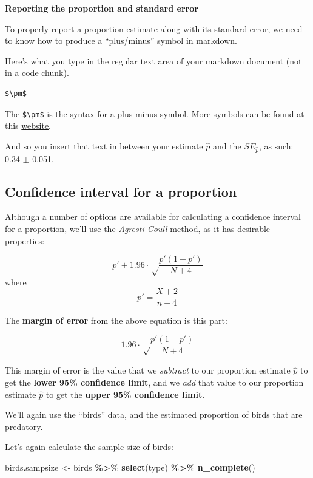 \documentclass[
]{book}
\newenvironment{Shaded}{\begin{snugshade}}{\end{snugshade}}
\newcommand{\FunctionTok}[1]{\textcolor[rgb]{0.13,0.29,0.53}{\textbf{#1}}}
\newcommand{\NormalTok}[1]{#1}
\newcommand{\OtherTok}[1]{\textcolor[rgb]{0.56,0.35,0.01}{#1}}
\newcommand{\SpecialCharTok}[1]{\textcolor[rgb]{0.81,0.36,0.00}{\textbf{#1}}}
\begin{document}
\textbf{Reporting the proportion and standard error}

To properly report a proportion estimate along with its standard error, we need to know how to produce a ``plus/minus'' symbol in markdown.

Here's what you type in the regular text area of your markdown document (not in a code chunk).

\begin{verbatim}
$\pm$
\end{verbatim}

The \texttt{\$\textbackslash{}pm\$} is the syntax for a plus-minus symbol. More symbols can be found at this \href{https://rpruim.github.io/s341/S19/from-class/MathinRmd.html}{website}.

And so you insert that text in between your estimate \(\hat{p}\) and the \(SE_\hat{p}\), as such: 0.34 \(\pm\) 0.051.

\subsection{Confidence interval for a proportion}\label{confint_prop}

Although a number of options are available for calculating a confidence interval for a proportion, we'll use the \emph{Agresti-Coull} method, as it has desirable properties:

\[p' \pm 1.96\cdot \sqrt\frac{p'(1-p')}{N+4}\] where \[p' = \frac{X+2}{n+4}\]

The \textbf{margin of error} from the above equation is this part:

\[1.96\cdot \sqrt\frac{p'(1-p')}{N+4}\]

This margin of error is the value that we \emph{subtract} to our proportion estimate \(\hat{p}\) to get the \textbf{lower 95\% confidence limit}, and we \emph{add} that value to our proportion estimate \(\hat{p}\) to get the \textbf{upper 95\% confidence limit}.

We'll again use the ``birds'' data, and the estimated proportion of birds that are predatory.

Let's again calculate the sample size of birds:

\begin{Shaded}
\begin{Highlighting}[]
\NormalTok{birds.sampsize }\OtherTok{\textless{}{-}}\NormalTok{ birds }\SpecialCharTok{\%\textgreater{}\%}
  \FunctionTok{select}\NormalTok{(type) }\SpecialCharTok{\%\textgreater{}\%}
  \FunctionTok{n\_complete}\NormalTok{()}
\end{Highlighting}
\end{Shaded}
\end{document}
